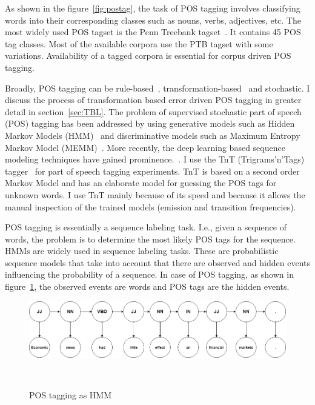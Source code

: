 As shown in the figure~\ref{fig:postag}, the task of POS tagging involves classifying words into their corresponding classes such as nouns, verbs, adjectives, etc. The most widely used POS tagset is the Penn Treebank tagset~\citep{Marcus:1994:PTA:1075812.1075835}. It contains 45 POS tag classes. Most of the available corpora use the PTB tagset with some variations. Availability of a tagged corpora is essential for corpus driven POS tagging. 

Broadly, POS tagging can be rule-based~, transformation-based~\citep{brill1992simple} and stochastic. I discuss the process of transformation based error driven POS tagging in greater detail in section~\ref{sec:TBL}. The problem of supervised stochastic part of speech (POS) tagging has been addressed by using generative models such as Hidden Markov Models (HMM)~\citep{brants:00.2} and  discriminative models such as Maximum Entropy Markov Model (MEMM)~\citep{ratnaparkhi1996maximum}. More recently, the deep learning based sequence modeling techniques have gained prominence.~. %
I use the TnT (Trigrams'n'Tags) tagger~\cite{brants:00.2} for part of speech tagging experiments. TnT is based on a second order Markov Model and has an elaborate model for guessing the POS tags for unknown words. I use TnT mainly because of its speed and because it allows the manual inspection of the trained models (emission and transition frequencies).

POS tagging is essentially a sequence labeling task. I.e., given a sequence of words, the problem is to determine the most likely POS tags for the sequence. HMMs are widely used in sequence labeling tasks. These are probabilistic sequence models that take into account that there are observed and hidden events influencing the probability of a sequence. In case of POS tagging, as shown in figure~\ref{fig:postaghmm}, the observed events are words and POS tags are the hidden events.

\begin{figure}[t]
    \includegraphics[scale = 0.45]{figures/hmmpos.png}
    \caption{POS tagging as HMM}~\label{fig:postaghmm}
\end{figure}

